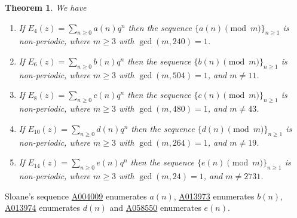 \documentclass[12pt,reqno]{amsart}
\newtheorem{theorem}{Theorem}[section]
\begin{document}
\begin{theorem}\label{theorem es} We have
\noindent
\begin{enumerate}
\item[\upshape(1)] If $E_4(z)= \sum_{n\geq0}a(n)q^n$ then the sequence $\{a(n) \pmod{m}\}_{n\geq1}$ is non-periodic, where $m\geq3$ with $\gcd(m,240)=1$.
\item[\upshape(2)] If $E_6(z)= \sum_{n\geq0}b(n)q^n$ then the sequence $\{b(n) \pmod{m}\}_{n\geq1}$ is non-periodic, where $m\geq3$ with $\gcd(m,504)=1$, and $m\neq11$.
\item[\upshape(3)] If $E_8(z)=\sum_{n\geq0}c(n)q^n$ then the sequence $\{c(n) \pmod{m}\}_{n\geq1}$ is non-periodic, where $m\geq3$ with $\gcd(m,480)=1$, and $m\neq 43$.
\item[\upshape(4)] If $E_{10}(z)=\sum_{n\geq0}d(n)q^n$ then the sequence $\{d(n) \pmod{m}\}_{n\geq1}$ is non-periodic, where $m\geq3$ with $\gcd(m,264)=1$, and $m\neq 19$.
\item[\upshape(5)] If $E_{14}(z)=\sum_{n\geq0}e(n)q^n$ then the sequence $\{e(n) \pmod{m}\}_{n\geq1}$ is non-periodic, where $m\geq3$ with $\gcd(m,24)=1$, and $m\neq 2731$.
\end{enumerate}
\end{theorem}
Sloane’s sequence \href{https://oeis.org/A004009}{A004009} enumerates $a(n)$,  \href{https://oeis.org/A013973}{A013973} enumerates $b(n)$, \href{https://oeis.org/A013974}{A013974} enumerates $d(n)$ and \href{https://oeis.org/A058550}{A058550} enumerates $e(n)$.
\end{document}
